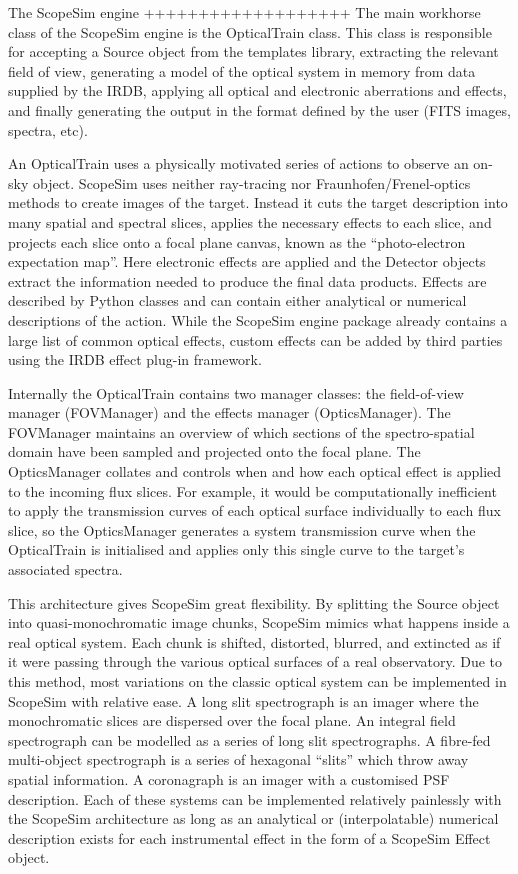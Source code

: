 The ScopeSim engine
+++++++++++++++++++
The main workhorse class of the ScopeSim engine is the OpticalTrain class. This
class is responsible for accepting a Source object from the templates library,
extracting the relevant field of view, generating a model of the optical system
in memory from data supplied by the IRDB, applying all optical and electronic
aberrations and effects, and finally generating the output in the format
defined by the user (FITS images, spectra, etc).

An OpticalTrain uses a physically motivated series of actions to observe an
on-sky object. ScopeSim uses neither ray-tracing nor Fraunhofen/Frenel-optics
methods to create images of the target. Instead it cuts the target description
into many spatial and spectral slices, applies the necessary effects to each
slice, and projects each slice onto a focal plane canvas, known as the
``photo-electron expectation map''. Here electronic effects are applied and the
Detector objects extract the information needed to produce the final data
products. Effects are described by Python classes and can contain
either analytical or numerical descriptions of the action. While the ScopeSim
engine package already contains a large list of common optical effects, custom
effects can be added by third parties using the IRDB effect plug-in framework.

Internally the OpticalTrain contains two manager classes: the field-of-view
manager (FOVManager) and the effects manager (OpticsManager). The FOVManager
maintains an overview of which sections of the spectro-spatial domain have been
sampled and projected onto the focal plane. The OpticsManager collates and
controls when and how each optical effect is applied to the incoming flux
slices. For example, it would be computationally inefficient to apply the
transmission curves of each optical surface individually to each flux slice, so
the OpticsManager generates a system transmission curve when the OpticalTrain is
initialised and applies only this single curve to the target's associated
spectra.

This architecture gives ScopeSim great flexibility. By splitting the Source
object into quasi-monochromatic image chunks, ScopeSim mimics what happens
inside a real optical system. Each chunk is shifted, distorted, blurred, and
extincted as if it were passing through the various optical surfaces
of a real observatory. Due to this method, most variations on the classic
optical system can be implemented in ScopeSim with relative ease. A long slit
spectrograph is an imager where the monochromatic slices are dispersed
over the focal plane. An integral field spectrograph can be modelled as a series
of long slit spectrographs. A fibre-fed multi-object spectrograph is a series of
hexagonal ``slits'' which throw away spatial information. A coronagraph is an
imager with a customised PSF description. Each of these systems can be
implemented relatively painlessly with the ScopeSim architecture as long as an
analytical or (interpolatable) numerical description exists for each
instrumental effect in the form of a ScopeSim Effect object.

